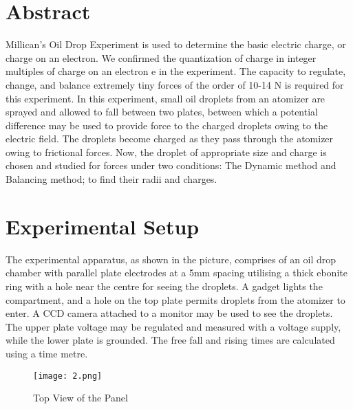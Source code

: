 \section{Abstract}
	Millican's Oil Drop Experiment is used to determine the basic electric charge, or charge on an electron. We confirmed the quantization of charge in integer multiples of charge on an electron e in the experiment. The capacity to regulate, change, and balance extremely tiny forces of the order of 10-14 N is required for this experiment. In this experiment, small oil droplets from an atomizer are sprayed and allowed to fall between two plates, between which a potential difference may be used to provide force to the charged droplets owing to the electric field. The droplets become charged as they pass through the atomizer owing to frictional forces. Now, the droplet of appropriate size and charge is chosen and studied for forces under two conditions: The Dynamic method and Balancing method; to find their radii and charges.

\section{Experimental Setup}
	The experimental apparatus, as shown in the picture, comprises of an oil drop chamber with parallel plate electrodes at a 5mm spacing utilising a thick ebonite ring with a hole near the centre for seeing the droplets. A gadget lights the compartment, and a hole on the top plate permits droplets from the atomizer to enter. A CCD camera attached to a monitor may be used to see the droplets. The upper plate voltage may be regulated and measured with a voltage supply, while the lower plate is grounded. The free fall and rising times are calculated using a time metre.

	\begin{figure}[H]
		\centering
		\texttt{[image: 2.png]}
		\caption{Top View of the Panel}
		\label{fig:2}
	\end{figure}